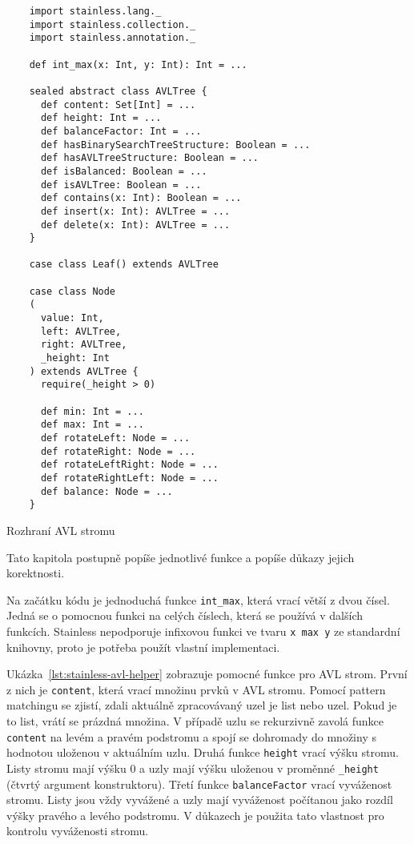 \begin{listing}[H]
    \begin{verbatim}
    import stainless.lang._
    import stainless.collection._
    import stainless.annotation._

    def int_max(x: Int, y: Int): Int = ...

    sealed abstract class AVLTree {
      def content: Set[Int] = ...
      def height: Int = ...
      def balanceFactor: Int = ...
      def hasBinarySearchTreeStructure: Boolean = ...
      def hasAVLTreeStructure: Boolean = ...
      def isBalanced: Boolean = ...
      def isAVLTree: Boolean = ...
      def contains(x: Int): Boolean = ...
      def insert(x: Int): AVLTree = ...
      def delete(x: Int): AVLTree = ...
    }

    case class Leaf() extends AVLTree

    case class Node
    (
      value: Int,
      left: AVLTree,
      right: AVLTree,
      _height: Int
    ) extends AVLTree {
      require(_height > 0)

      def min: Int = ...
      def max: Int = ...
      def rotateLeft: Node = ...
      def rotateRight: Node = ...
      def rotateLeftRight: Node = ...
      def rotateRightLeft: Node = ...
      def balance: Node = ...
    }
    \end{verbatim}
    \caption{Rozhraní AVL stromu}
    \label{lst:stainless-avl-interface}
\end{listing}

Tato kapitola postupně popíše jednotlivé funkce a popíše důkazy jejich korektnosti.

Na začátku kódu je jednoduchá funkce \texttt{int\_max}, která vrací větší z dvou čísel.
Jedná se o pomocnou funkci na celých číslech, která se používá v dalších funkcích.
Stainless nepodporuje infixovou funkci ve tvaru \texttt{x max y} ze standardní knihovny,
proto je potřeba použít vlastní implementaci.

Ukázka~\ref{lst:stainless-avl-helper} zobrazuje pomocné funkce pro AVL strom.
První z nich je \texttt{content}, která vrací množinu prvků v AVL stromu.
Pomocí pattern matchingu se zjistí, zdali aktuálně zpracovávaný uzel je list nebo uzel.
Pokud je to list, vrátí se prázdná množina.
V případě uzlu se rekurzivně zavolá funkce \texttt{content} na levém a pravém podstromu
a spojí se dohromady do množiny s hodnotou uloženou v aktuálním uzlu.
Druhá funkce \texttt{height} vrací výšku stromu.
Listy stromu mají výšku 0 a uzly mají výšku uloženou v proměnné \texttt{\_height} (čtvrtý argument konstruktoru).
Třetí funkce \texttt{balanceFactor} vrací vyváženost stromu.
Listy jsou vždy vyvážené a uzly mají vyváženost počítanou jako rozdíl výšky pravého a levého podstromu.
V důkazech je použita tato vlastnost pro kontrolu vyváženosti stromu.

